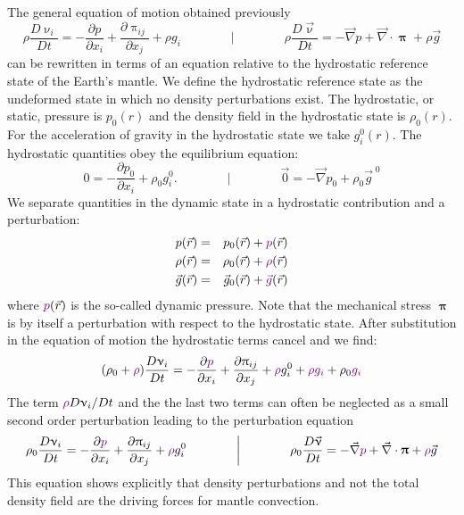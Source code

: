 The general equation of motion obtained previously
\begin{equation}
\rho \frac{D\upnu_i}{Dt} = -\frac{\partial p}{\partial x_i} + 
\frac{\partial \uppi_{ij}}{\partial x_j} + \rho g_i
\qquad
\qquad
\bigg\rvert
\qquad
\qquad
\rho \frac{D\vec\upnu}{Dt} = -\vec\nabla p + \vec\nabla \cdot {\bm \uppi} + \rho \vec{g}
\end{equation}
can be rewritten in terms
of an equation relative to the hydrostatic reference state of the Earth's mantle. We define
the hydrostatic reference state as the undeformed state in which no density perturbations
exist. The hydrostatic, or static, pressure is $p_0(r)$ and the density field in the hydrostatic
state is $\rho_0(r)$. For the acceleration of gravity in the hydrostatic state we take $g_i^0(r)$. 
The hydrostatic quantities obey the equilibrium equation: 
\begin{equation}
0 = -\frac{\partial p_0}{\partial x_i} + \rho_0 g_i^0.
\qquad
\qquad
\bigg\rvert
\qquad
\qquad
\vec{0} = -\vec\nabla p_0 + \rho_0 \vec{g}^{\; 0}
\end{equation}
We separate quantities in the dynamic state in a hydrostatic contribution and a
perturbation:
\begin{eqnarray}
p(\vec{r}) &=& p_0(\vec{r}) + {\color{violet} p}(\vec{r}) \nonumber\\
\rho(\vec{r}) &=& \rho_0(\vec{r}) + {\color{violet}\rho}(\vec{r}) \nonumber\\
\vec{g}(\vec{r}) &=& \vec{g}_0(\vec{r}) + {\color{violet}\vec{g}}(\vec{r}) \nonumber
\end{eqnarray}
where ${\color{violet} p}(\vec{r})$ is the so-called dynamic pressure.
Note that the mechanical stress ${\bm \uppi}$ is by
itself a perturbation with respect to the hydrostatic state. After substitution in the equation
of motion the hydrostatic terms cancel and we find:
\begin{equation}
(\rho_0 + {\color{violet}\rho})  \frac{D\upnu_i}{Dt}
= -\frac{\partial {\color{violet} p}}{\partial x_i} + \frac{\partial \uppi_{ij}}{\partial x_j}
+ {\color{violet} \rho} g_i^0 +  {\color{violet} \rho} {\color{violet} g_i}
+ \rho_0  {\color{violet} g_i}
\label{eq:md34a}
\end{equation}
The term $ {\color{violet}\rho} D\upnu_i/Dt$ and the the last two terms can often be 
neglected as a small second order
perturbation leading to the perturbation equation
\begin{equation}
\rho_0   \frac{D\upnu_i}{Dt}
= -\frac{\partial {\color{violet} p}}{\partial x_i} + \frac{\partial \uppi_{ij}}{\partial x_j}
+ {\color{violet} \rho} g_i^0 
\qquad
\qquad
\bigg\rvert
\qquad
\qquad
\rho_0   \frac{D\vec\upnu}{Dt}
=
-\vec\nabla {\color{violet} p} + \vec\nabla \cdot {\bm \uppi} + {\color{violet}\rho} \vec{g}
\label{eq:md34b}
\end{equation}
This equation shows explicitly that density perturbations and not the total density field
are the driving forces for mantle convection.


